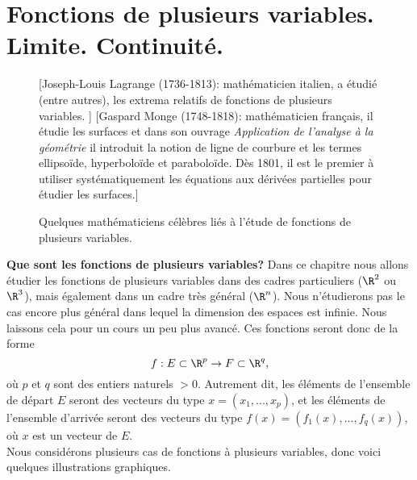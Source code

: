 \documentclass[class=report,crop=false]{standalone}
\begin{document}
 
\chapter{Fonctions de plusieurs variables. Limite. Continuité.}


\begin{figure}[!h]
    [Joseph-Louis Lagrange (1736-1813): mathématicien italien, a étudié (entre autres), les extrema relatifs de fonctions de plusieurs variables. ]
    {
        \label{fig:Joseph-Louis_Lagrange}
    }
    [\color{blue}Gaspard Monge (1748-1818): mathématicien français, il étudie les surfaces et dans son ouvrage  \textit{Application de l'analyse à la géométrie } il introduit la notion de ligne de courbure et les termes ellipsoïde, hyperboloïde et paraboloïde.
Dès 1801, il est le premier à utiliser systématiquement les équations aux dérivées partielles pour étudier les surfaces.]
    {
        \label{fig:gaspard_monge}
    }
    \caption{Quelques mathématiciens célèbres liés à l'étude de fonctions de plusieurs variables.}
    \label{fig:math2}
\end{figure}





\textbf{Que sont les fonctions de plusieurs variables?} Dans ce chapitre nous allons étudier les fonctions de plusieurs variables dans des cadres particuliers ($\R^2$ ou $\R^3$), mais également dans un cadre très général ($\R^n$). 
Nous n'étudierons pas le cas encore plus général dans lequel la dimension des
espaces est infinie. Nous laissons cela pour un cours un peu plus avancé. Ces fonctions seront donc de la forme 
\begin{equation*}
f:E \subset \R^p \rightarrow F \subset \R^q,
\end{equation*}
où $p$ et $q$ sont des entiers naturels $>0$. Autrement dit, les éléments de l'ensemble de départ $E$ seront des vecteurs du type $x=(x_1,...,x_p)$, et les éléments de l'ensemble d'arrivée seront des vecteurs du type $f(x)=(f_1(x), ...,f_q(x))$, où $x$ est un vecteur de $E$.\\
Nous considérons plusieurs cas de fonctions à plusieurs variables, donc voici quelques illustrations graphiques. \\
\end{document}
